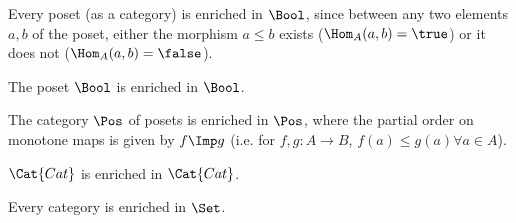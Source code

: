 \begin{example}\label{ex:enrichbool}Every poset (as a category) is enriched in $\Bool$, since between any two elements $a,b$ of the poset, either the morphism $a \leq b$ exists ($\Hom_A(a,b) = \true$) or it does not ($\Hom_A(a,b) = \false$).\end{example}

\begin{example}The poset $\Bool$ is enriched in $\Bool$.\end{example}

\begin{example}The category $\Pos$ of posets is enriched in $\Pos$, where the partial order on monotone maps is given by $f \Imp g$ (i.e. for $f,g : A \to B$, $f(a) \leq g(a) \forall a \in A$).\end{example}

%

\begin{example}$\Cat{Cat}$ is enriched in $\Cat{Cat}$.\end{example}

\begin{example}Every category is enriched in $\Set$.\end{example}


